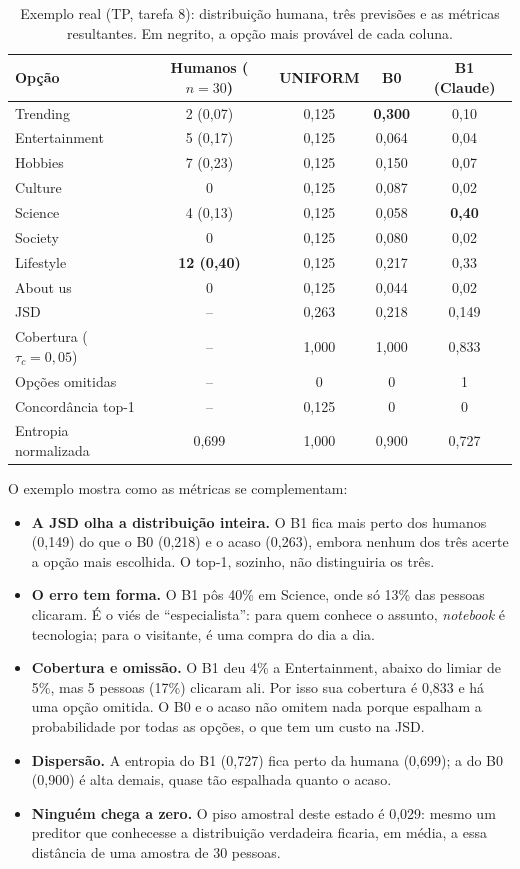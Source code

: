\documentclass[12pt,oneside,a4paper,chapter=TITLE,english,brazil]{abntex2}
\begin{document}
\begin{table}[htb]
\centering
\caption{Exemplo real (TP, tarefa 8): distribuição humana, três previsões e as métricas resultantes. Em negrito, a opção mais provável de cada coluna.}
\label{tab:exemplo}
\footnotesize
\begin{tabular}{@{}lcccc@{}}
\toprule
\textbf{Opção} & \textbf{Humanos ($n=30$)} & \textbf{UNIFORM} & \textbf{B0} & \textbf{B1 (Claude)} \\
\midrule
Trending & 2 (0,07) & 0,125 & \textbf{0,300} & 0,10 \\
Entertainment & 5 (0,17) & 0,125 & 0,064 & 0,04 \\
Hobbies & 7 (0,23) & 0,125 & 0,150 & 0,07 \\
Culture & 0 & 0,125 & 0,087 & 0,02 \\
Science & 4 (0,13) & 0,125 & 0,058 & \textbf{0,40} \\
Society & 0 & 0,125 & 0,080 & 0,02 \\
Lifestyle & \textbf{12 (0,40)} & 0,125 & 0,217 & 0,33 \\
About us & 0 & 0,125 & 0,044 & 0,02 \\
\midrule
JSD & -- & 0,263 & 0,218 & 0,149 \\
Cobertura ($\tau_c=0{,}05$) & -- & 1,000 & 1,000 & 0,833 \\
Opções omitidas & -- & 0 & 0 & 1 \\
Concordância top-1 & -- & 0,125 & 0 & 0 \\
Entropia normalizada & 0,699 & 1,000 & 0,900 & 0,727 \\
\bottomrule
\end{tabular}
\end{table}

O exemplo mostra como as métricas se complementam:

\begin{itemize}
\item \textbf{A JSD olha a distribuição inteira.} O B1 fica mais perto dos humanos (0,149) do que o B0 (0,218) e o acaso (0,263), embora nenhum dos três acerte a opção mais escolhida. O top-1, sozinho, não distinguiria os três.
\item \textbf{O erro tem forma.} O B1 pôs 40\% em Science, onde só 13\% das pessoas clicaram. É o viés de ``especialista'': para quem conhece o assunto, \textit{notebook} é tecnologia; para o visitante, é uma compra do dia a dia.
\item \textbf{Cobertura e omissão.} O B1 deu 4\% a Entertainment, abaixo do limiar de 5\%, mas 5 pessoas (17\%) clicaram ali. Por isso sua cobertura é 0,833 e há uma opção omitida. O B0 e o acaso não omitem nada porque espalham a probabilidade por todas as opções, o que tem um custo na JSD.
\item \textbf{Dispersão.} A entropia do B1 (0,727) fica perto da humana (0,699); a do B0 (0,900) é alta demais, quase tão espalhada quanto o acaso.
\item \textbf{Ninguém chega a zero.} O piso amostral deste estado é 0,029: mesmo um preditor que conhecesse a distribuição verdadeira ficaria, em média, a essa distância de uma amostra de 30 pessoas.
\end{itemize}
\end{document}

